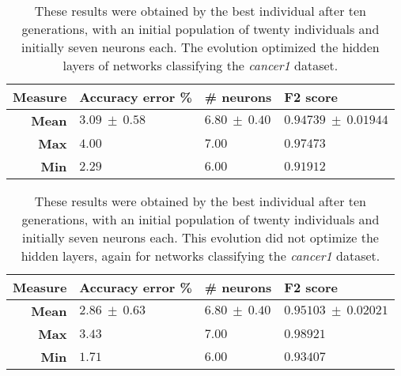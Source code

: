 \documentclass[runningheads]{llncs}
\begin{document}
 \begin{table}
     \centering
     \caption{
These results were obtained by the best individual after ten generations, 
with an initial population of twenty individuals and initially seven neurons each. 
The evolution optimized the hidden layers of networks classifying the \emph{cancer1} dataset.}
     \label{tab:fixed-7-1-noconst-can1}
     \begin{tabular}{rlll}
         \textbf{Measure}   & \textbf{Accuracy error \%} & \textbf{\# neurons} & \textbf{F2 score} \\
         \hline
        \textbf{Mean}      & $3.09\ \pm\ 0.58$      & $6.80\ \pm\ 0.40$       & $0.94739\ \pm\ 0.01944$ \\
         \textbf{Max}       & $4.00$                 & $7.00$                  & $0.97473$               \\
         \textbf{Min}       & $2.29$                 & $6.00$                  & $0.91912$               \\
     \end{tabular}
 \end{table}

 \begin{table}
     \centering
     \caption{
These results were obtained by the best individual after ten generations, with
an initial population of twenty individuals and initially seven
neurons each. %
This evolution did not optimize the hidden layers, again for networks
classifying the \emph{cancer1} dataset.}
     \label{tab:fixed-7-1-const-can1}
     \begin{tabular}{rlll}
        \textbf{Measure}   & \textbf{Accuracy error \%} & \textbf{\# neurons} & \textbf{F2 score} \\
         \hline
         \textbf{Mean}      & $2.86\ \pm\ 0.63$      & $6.80\ \pm\ 0.40$       & $0.95103\ \pm\ 0.02021$ \\
         \textbf{Max}       & $3.43$                 & $7.00$                  & $0.98921$               \\
         \textbf{Min}       & $1.71$                 & $6.00$                  & $0.93407$               \\
     \end{tabular}
 \end{table}
\end{document}
